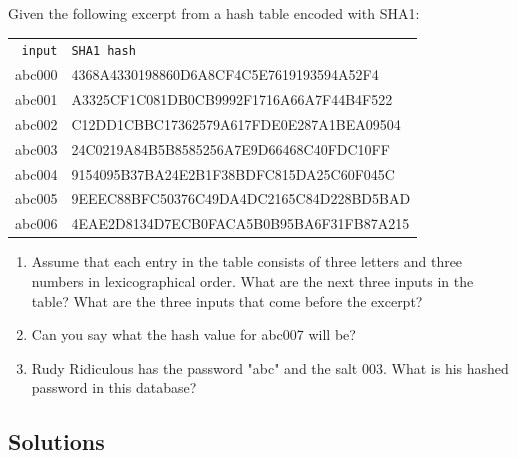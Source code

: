 \documentclass[11pt,a4paper]{report}
\begin{document}
\begin{ex}
Given the following excerpt from a hash table encoded with  SHA1:

\begin{tabular}{rl}
\texttt{input} & \texttt{SHA1 hash} \\
abc000 & 4368A4330198860D6A8CF4C5E7619193594A52F4 \\
abc001 & A3325CF1C081DB0CB9992F1716A66A7F44B4F522 \\
abc002 & C12DD1CBBC17362579A617FDE0E287A1BEA09504 \\
abc003 & 24C0219A84B5B8585256A7E9D66468C40FDC10FF \\ 
abc004 & 9154095B37BA24E2B1F38BDFC815DA25C60F045C \\
abc005 & 9EEEC88BFC50376C49DA4DC2165C84D228BD5BAD \\
abc006 & 4EAE2D8134D7ECB0FACA5B0B95BA6F31FB87A215 
\end{tabular}

\begin{enumerate}
\item Assume that each entry in the table consists of three letters and three numbers in lexicographical order.
What are the next three inputs in the table? What are the three inputs that come before the excerpt?
\item Can you say what the hash value for abc007 will be?
\item Rudy Ridiculous has the password "abc" and the salt $003$. What is his hashed password in this database?
\end{enumerate}
\end{ex}

\subsection{Solutions}
\printcursols
\end{document}
